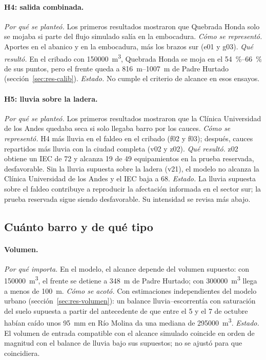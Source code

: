 \paragraph{H4: salida combinada.} \emph{Por qué se planteó.} Los primeros resultados mostraron que Quebrada Honda solo se mojaba si parte del flujo simulado salía en la embocadura. \emph{Cómo se representó.} Aportes en el abanico y en la embocadura, más los brazos sur (e01 y g03). \emph{Qué resultó.} En el cribado con \SI{150000}{m^3}, Quebrada Honda se moja en el \SIrange{54}{66}{\percent} de sus puntos, pero el frente queda a \SIrange{816}{1007}{m} de Padre Hurtado (sección~\ref{sec:res-calib}). \emph{Estado.} No cumple el criterio de alcance en esos ensayos.

\paragraph{H5: lluvia sobre la ladera.} \emph{Por qué se planteó.} Los primeros resultados mostraron que la Clínica Universidad de los Andes quedaba seca si solo llegaba barro por los cauces. \emph{Cómo se representó.} H4 más lluvia en el faldeo en el cribado (f02 y f03); después, cauces repartidos más lluvia con la ciudad completa (v02 y z02). \emph{Qué resultó.} z02 obtiene un IEC de 72 y alcanza 19 de 49 equipamientos en la prueba reservada, desfavorable. Sin la lluvia supuesta sobre la ladera (v21), el modelo no alcanza la Clínica Universidad de los Andes y el IEC baja a 68. \emph{Estado.} La lluvia supuesta sobre el faldeo contribuye a reproducir la afectación informada en el sector sur; la prueba reservada sigue siendo desfavorable. Su intensidad se revisa más abajo.

\subsection{Cuánto barro y de qué tipo}
\paragraph{Volumen.} \emph{Por qué importa.} En el modelo, el alcance depende del volumen supuesto: con \SI{150000}{m^3}, el frente se detiene a \SI{348}{m} de Padre Hurtado; con \SI{300000}{m^3} llega a menos de \SI{100}{m}. \emph{Cómo se acotó.} Con estimaciones independientes del modelo urbano (sección~\ref{sec:res-volumen}): un balance lluvia--escorrentía con saturación del suelo supuesta a partir del antecedente de que entre el 5 y el 7 de octubre habían caído unos \SI{95}{mm} en Río Molina \citep{cr2_2026} da una mediana de \SI{295000}{m^3}. \emph{Estado.} El volumen de entrada compatible con el alcance simulado coincide en orden de magnitud con el balance de lluvia bajo sus supuestos; no se ajustó para que coincidiera.

